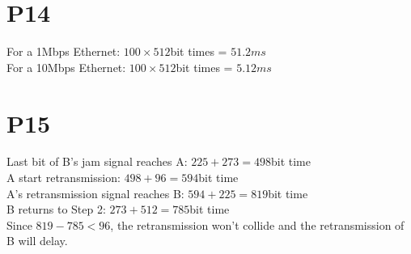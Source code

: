 \documentclass[12pt]{article}
\begin{document}
\section*{P14}
For a 1Mbps Ethernet: $100\times 512$bit times = $51.2ms$\\
For a 10Mbps Ethernet: $100\times 512$bit times = $5.12ms$

\section*{P15}
Last bit of B's jam signal reaches A: $225+273=498$bit time\\
A start retransmission: $498+96=594$bit time\\
A's retransmission signal reaches B: $594+225=819$bit time\\

B returns to Step 2: $273+512=785$bit time\\

Since $819-785<96$, the retransmission won't collide and the retransmission of B will delay.
\end{document}
